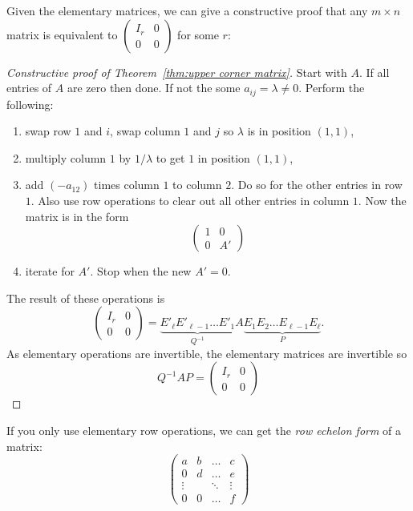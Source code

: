 \documentclass[a4paper]{article}
\theoremstyle{definition}
\begin{document}
Given the elementary matrices, we can give a constructive proof that any \(m\times n\) matrix is equivalent to \(\begin{pmatrix} I_r & 0 \\ 0 & 0 \end{pmatrix}\) for some \(r\):

\begin{proof}[Constructive proof of Theorem~\ref{thm:upper corner matrix}]
  Start with \(A\). If all entries of \(A\) are zero then done. If not the some \(a_{ij} = \lambda \neq 0\). Perform the following:
  \begin{enumerate}
  \item swap row \(1\) and \(i\), swap column \(1\) and \(j\) so \(\lambda\) is in position \((1,1)\),
  \item multiply column \(1\) by \(1/\lambda\) to get \(1\) in position \((1,1)\),
  \item add \((-a_{12})\) times column \(1\) to column \(2\). Do so for the other entries in row \(1\). Also use row operations to clear out all other entries in column \(1\). Now the matrix is in the form
    \[
      \begin{pmatrix}
        1 & 0 \\
        0 & A'
      \end{pmatrix}
    \]
  \item iterate for \(A'\). Stop when the new \(A' = 0\).
  \end{enumerate}
  The result of these operations is
  \[
    \begin{pmatrix}
      I_r & 0 \\
      0 & 0
    \end{pmatrix}
    =\underbrace{E'_{\ell}E'_{\ell-1}\dots E'_1}_{Q^{-1}} A \underbrace{E_1E_2\dots E_{\ell-1}E_\ell}_{P}.
  \]
  As elementary operations are invertible, the elementary matrices are invertible so
  \[
    Q^{-1}AP = 
     \begin{pmatrix}
      I_r & 0 \\
      0 & 0
    \end{pmatrix}
  \]
\end{proof}

If you only use elementary row operations, we can get the \emph{row echelon form} of a matrix:
\[
  \begin{pmatrix}
    a & b & \dots & c \\
    0 & d & \dots & e \\
    \vdots & & \ddots & \vdots \\
    0 & 0 & \dots & f
  \end{pmatrix}
\]
\end{document}
